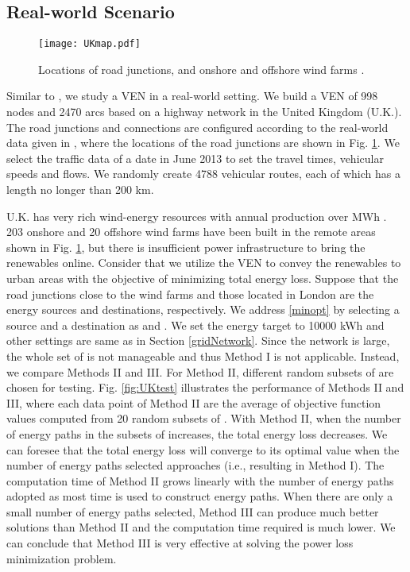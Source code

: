 \documentclass[journal]{IEEEtran}
\begin{document}
\subsection{Real-world Scenario}

\begin{figure}[!t]
\centering
\texttt{[image: UKmap.pdf]} 
\caption{Locations of road junctions, and onshore and offshore wind farms \cite{VEN}.}
\label{fig:UKmap}
\end{figure}

Similar to \cite{VEN}, we study a VEN in a real-world setting. We build a VEN of 998 nodes and 2470 arcs based on  a highway network in the United Kingdom (U.K.). The road junctions and connections are configured according to the real-world data given in  \cite{ukroads}, where the locations of the road junctions are shown in Fig. \ref{fig:UKmap}. We select the traffic data of a date in June 2013 to set the travel times, vehicular speeds and flows. We randomly create 4788 vehicular routes, each of which  has a length no longer than 200 km.

U.K. has very rich wind-energy resources with annual production over  MWh \cite{UKWindDB}. 203 onshore and 20 offshore wind farms have been built in the remote areas \cite{onshore,offshore} shown in Fig. \ref{fig:UKmap}, but there is   insufficient power infrastructure to bring the renewables online. Consider that we utilize the VEN to convey the renewables to urban areas with the objective of minimizing total energy loss. Suppose that the road junctions close to the wind farms and those located in London are the energy sources and destinations, respectively. We address \eqref{minopt} by selecting a source and a destination as  and . We set the energy target  to 10000 kWh and other settings are same as in  Section \ref{gridNetwork}.
Since the network is large, the whole set of  is not manageable and thus Method I is not applicable. Instead, we compare Methods II and III. For Method II, different random subsets of  are chosen for testing. Fig. \ref{fig:UKtest} illustrates the performance of Methods II and III, where each data point of Method II are the average of objective function values computed from 20 random subsets of .
With Method II, when the number of energy paths in the subsets of  increases, the total energy loss decreases. We can foresee that the total energy loss will converge to its optimal value when the number of energy paths selected approaches  (i.e., resulting in Method I). The computation time of Method II grows linearly with the number of energy paths adopted as most time is used to construct energy paths. When there are only a small number of energy paths selected, Method III can produce much better solutions than Method II and the computation time required is much lower. We can conclude that Method III is very effective at solving the power loss minimization problem.
\end{document}
